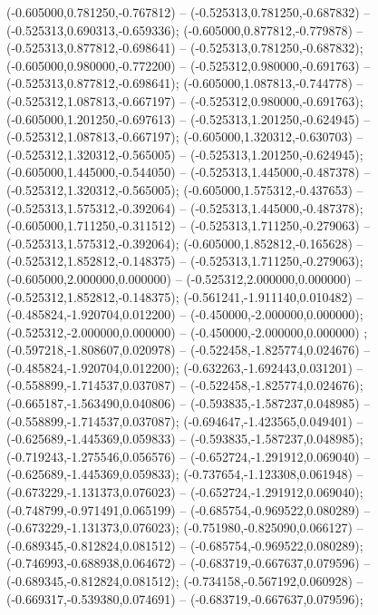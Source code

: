  (-0.605000,0.781250,-0.767812) -- (-0.525313,0.781250,-0.687832) -- (-0.525313,0.690313,-0.659336);
 (-0.605000,0.877812,-0.779878) -- (-0.525313,0.877812,-0.698641) -- (-0.525313,0.781250,-0.687832);
 (-0.605000,0.980000,-0.772200) -- (-0.525312,0.980000,-0.691763) -- (-0.525313,0.877812,-0.698641);
 (-0.605000,1.087813,-0.744778) -- (-0.525312,1.087813,-0.667197) -- (-0.525312,0.980000,-0.691763);
 (-0.605000,1.201250,-0.697613) -- (-0.525313,1.201250,-0.624945) -- (-0.525312,1.087813,-0.667197);
 (-0.605000,1.320312,-0.630703) -- (-0.525312,1.320312,-0.565005) -- (-0.525313,1.201250,-0.624945);
 (-0.605000,1.445000,-0.544050) -- (-0.525313,1.445000,-0.487378) -- (-0.525312,1.320312,-0.565005);
 (-0.605000,1.575312,-0.437653) -- (-0.525313,1.575312,-0.392064) -- (-0.525313,1.445000,-0.487378);
 (-0.605000,1.711250,-0.311512) -- (-0.525313,1.711250,-0.279063) -- (-0.525313,1.575312,-0.392064);
 (-0.605000,1.852812,-0.165628) -- (-0.525312,1.852812,-0.148375) -- (-0.525313,1.711250,-0.279063);
 (-0.605000,2.000000,0.000000) -- (-0.525312,2.000000,0.000000) -- (-0.525312,1.852812,-0.148375);
 (-0.561241,-1.911140,0.010482) -- (-0.485824,-1.920704,0.012200) -- (-0.450000,-2.000000,0.000000);
 (-0.525312,-2.000000,0.000000) -- (-0.450000,-2.000000,0.000000) ;
 (-0.597218,-1.808607,0.020978) -- (-0.522458,-1.825774,0.024676) -- (-0.485824,-1.920704,0.012200);
 (-0.632263,-1.692443,0.031201) -- (-0.558899,-1.714537,0.037087) -- (-0.522458,-1.825774,0.024676);
 (-0.665187,-1.563490,0.040806) -- (-0.593835,-1.587237,0.048985) -- (-0.558899,-1.714537,0.037087);
 (-0.694647,-1.423565,0.049401) -- (-0.625689,-1.445369,0.059833) -- (-0.593835,-1.587237,0.048985);
 (-0.719243,-1.275546,0.056576) -- (-0.652724,-1.291912,0.069040) -- (-0.625689,-1.445369,0.059833);
 (-0.737654,-1.123308,0.061948) -- (-0.673229,-1.131373,0.076023) -- (-0.652724,-1.291912,0.069040);
 (-0.748799,-0.971491,0.065199) -- (-0.685754,-0.969522,0.080289) -- (-0.673229,-1.131373,0.076023);
 (-0.751980,-0.825090,0.066127) -- (-0.689345,-0.812824,0.081512) -- (-0.685754,-0.969522,0.080289);
 (-0.746993,-0.688938,0.064672) -- (-0.683719,-0.667637,0.079596) -- (-0.689345,-0.812824,0.081512);
 (-0.734158,-0.567192,0.060928) -- (-0.669317,-0.539380,0.074691) -- (-0.683719,-0.667637,0.079596);
